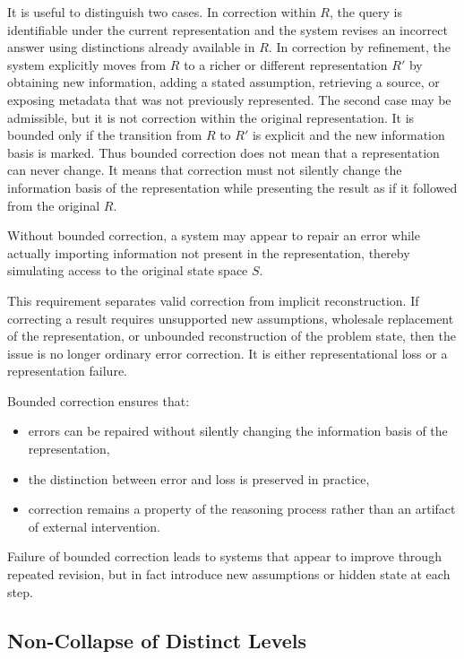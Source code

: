 \documentclass[11pt]{article}
\begin{document}
It is useful to distinguish two cases. In correction within $R$, the query is identifiable under the current representation and the system revises an incorrect answer using distinctions already available in $R$. In correction by refinement, the system explicitly moves from $R$ to a richer or different representation $R'$ by obtaining new information, adding a stated assumption, retrieving a source, or exposing metadata that was not previously represented. The second case may be admissible, but it is not correction within the original representation. It is bounded only if the transition from $R$ to $R'$ is explicit and the new information basis is marked. Thus bounded correction does not mean that a representation can never change. It means that correction must not silently change the information basis of the representation while presenting the result as if it followed from the original $R$.

Without bounded correction, a system may appear to repair an error while actually importing information not present in the representation, thereby simulating access to the original state space $S$.

This requirement separates valid correction from implicit reconstruction. If correcting a result requires unsupported new assumptions, wholesale replacement of the representation, or unbounded reconstruction of the problem state, then the issue is no longer ordinary error correction. It is either representational loss or a representation failure.

Bounded correction ensures that:

\begin{itemize}[leftmargin=1.5em]
    \item errors can be repaired without silently changing the information basis of the representation,
    \item the distinction between error and loss is preserved in practice,
    \item correction remains a property of the reasoning process rather than an artifact of external intervention.
\end{itemize}

Failure of bounded correction leads to systems that appear to improve through repeated revision, but in fact introduce new assumptions or hidden state at each step.

\subsection{Non-Collapse of Distinct Levels}
\end{document}
